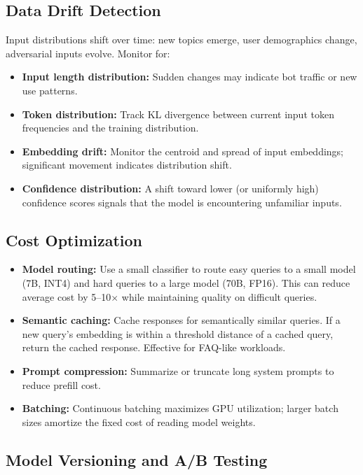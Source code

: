 \subsection{Data Drift Detection}

Input distributions shift over time: new topics emerge, user demographics change,
adversarial inputs evolve.  Monitor for:
\begin{itemize}
    \item \textbf{Input length distribution:} Sudden changes may indicate bot traffic
          or new use patterns.
    \item \textbf{Token distribution:} Track KL divergence between current input token
          frequencies and the training distribution.
    \item \textbf{Embedding drift:} Monitor the centroid and spread of input embeddings;
          significant movement indicates distribution shift.
    \item \textbf{Confidence distribution:} A shift toward lower (or uniformly high)
          confidence scores signals that the model is encountering unfamiliar inputs.
\end{itemize}

\subsection{Cost Optimization}

\begin{itemize}
    \item \textbf{Model routing:}  Use a small classifier to route easy queries to a
          small model (7B, INT4) and hard queries to a large model (70B, FP16).  This
          can reduce average cost by 5--10$\times$ while maintaining quality on
          difficult queries.
    \item \textbf{Semantic caching:}  Cache responses for semantically similar queries.
          If a new query's embedding is within a threshold distance of a cached query,
          return the cached response.  Effective for FAQ-like workloads.
    \item \textbf{Prompt compression:}  Summarize or truncate long system prompts
          to reduce prefill cost.
    \item \textbf{Batching:}  Continuous batching maximizes GPU utilization; larger
          batch sizes amortize the fixed cost of reading model weights.
\end{itemize}

\subsection{Model Versioning and A/B Testing}

